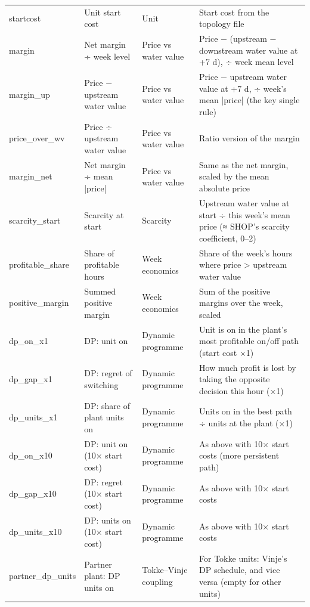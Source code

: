 \begin{longtable}{p{2.6cm}p{3.6cm}p{2.4cm}p{5.6cm}}
startcost & Unit start cost & Unit & Start cost from the topology file \\
margin & Net margin ÷ week level & Price vs water value & Price − (upstream − downstream water value at +7 d), ÷ week mean level \\
margin\_\allowbreak{}up & Price − upstream water value & Price vs water value & Price − upstream water value at +7 d, ÷ week's mean |price| (the key single rule) \\
price\_\allowbreak{}over\_\allowbreak{}wv & Price ÷ upstream water value & Price vs water value & Ratio version of the margin \\
margin\_\allowbreak{}net & Net margin ÷ mean |price| & Price vs water value & Same as the net margin, scaled by the mean absolute price \\
scarcity\_\allowbreak{}start & Scarcity at start & Scarcity & Upstream water value at start ÷ this week's mean price (≈ SHOP's scarcity coefficient, 0–2) \\
profitable\_\allowbreak{}share & Share of profitable hours & Week economics & Share of the week's hours where price > upstream water value \\
positive\_\allowbreak{}margin & Summed positive margin & Week economics & Sum of the positive margins over the week, scaled \\
dp\_\allowbreak{}on\_\allowbreak{}x1 & DP: unit on & Dynamic programme & Unit is on in the plant's most profitable on/off path (start cost ×1) \\
dp\_\allowbreak{}gap\_\allowbreak{}x1 & DP: regret of switching & Dynamic programme & How much profit is lost by taking the opposite decision this hour (×1) \\
dp\_\allowbreak{}units\_\allowbreak{}x1 & DP: share of plant units on & Dynamic programme & Units on in the best path ÷ units at the plant (×1) \\
dp\_\allowbreak{}on\_\allowbreak{}x10 & DP: unit on (10× start cost) & Dynamic programme & As above with 10× start costs (more persistent path) \\
dp\_\allowbreak{}gap\_\allowbreak{}x10 & DP: regret (10× start cost) & Dynamic programme & As above with 10× start costs \\
dp\_\allowbreak{}units\_\allowbreak{}x10 & DP: units on (10× start cost) & Dynamic programme & As above with 10× start costs \\
partner\_\allowbreak{}dp\_\allowbreak{}units & Partner plant: DP units on & Tokke–Vinje coupling & For Tokke units: Vinje's DP schedule, and vice versa (empty for other units) \\

\end{longtable}
